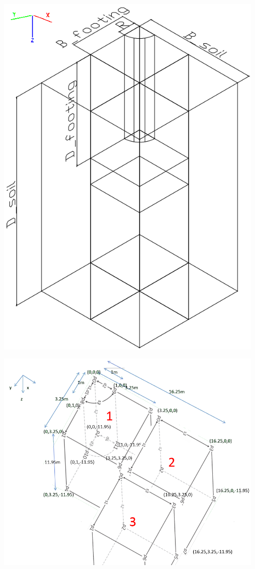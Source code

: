 \documentclass[a4paper, nobind]{templates/ociamthesis}
\begin{document}
\includegraphics[width=1\linewidth]{myfigureeeeee/new_configuration}

\includegraphics[width=1\linewidth]{myfigureeeeee/blocks}
\end{document}
